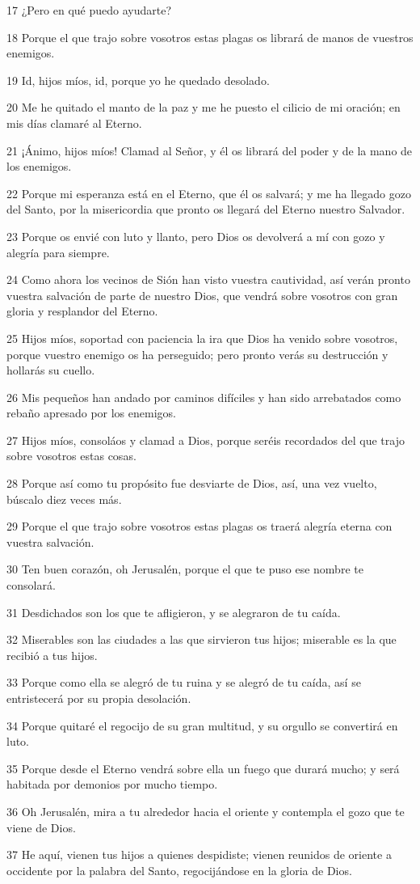 \par 17 ¿Pero en qué puedo ayudarte?
\par 18 Porque el que trajo sobre vosotros estas plagas os librará de manos de vuestros enemigos.
\par 19 Id, hijos míos, id, porque yo he quedado desolado.
\par 20 Me he quitado el manto de la paz y me he puesto el cilicio de mi oración; en mis días clamaré al Eterno.
\par 21 ¡Ánimo, hijos míos! Clamad al Señor, y él os librará del poder y de la mano de los enemigos.
\par 22 Porque mi esperanza está en el Eterno, que él os salvará; y me ha llegado gozo del Santo, por la misericordia que pronto os llegará del Eterno nuestro Salvador.
\par 23 Porque os envié con luto y llanto, pero Dios os devolverá a mí con gozo y alegría para siempre.
\par 24 Como ahora los vecinos de Sión han visto vuestra cautividad, así verán pronto vuestra salvación de parte de nuestro Dios, que vendrá sobre vosotros con gran gloria y resplandor del Eterno.
\par 25 Hijos míos, soportad con paciencia la ira que Dios ha venido sobre vosotros, porque vuestro enemigo os ha perseguido; pero pronto verás su destrucción y hollarás su cuello.
\par 26 Mis pequeños han andado por caminos difíciles y han sido arrebatados como rebaño apresado por los enemigos.
\par 27 Hijos míos, consoláos y clamad a Dios, porque seréis recordados del que trajo sobre vosotros estas cosas.
\par 28 Porque así como tu propósito fue desviarte de Dios, así, una vez vuelto, búscalo diez veces más.
\par 29 Porque el que trajo sobre vosotros estas plagas os traerá alegría eterna con vuestra salvación.
\par 30 Ten buen corazón, oh Jerusalén, porque el que te puso ese nombre te consolará.
\par 31 Desdichados son los que te afligieron, y se alegraron de tu caída.
\par 32 Miserables son las ciudades a las que sirvieron tus hijos; miserable es la que recibió a tus hijos.
\par 33 Porque como ella se alegró de tu ruina y se alegró de tu caída, así se entristecerá por su propia desolación.
\par 34 Porque quitaré el regocijo de su gran multitud, y su orgullo se convertirá en luto.
\par 35 Porque desde el Eterno vendrá sobre ella un fuego que durará mucho; y será habitada por demonios por mucho tiempo.
\par 36 Oh Jerusalén, mira a tu alrededor hacia el oriente y contempla el gozo que te viene de Dios.
\par 37 He aquí, vienen tus hijos a quienes despidiste; vienen reunidos de oriente a occidente por la palabra del Santo, regocijándose en la gloria de Dios.

